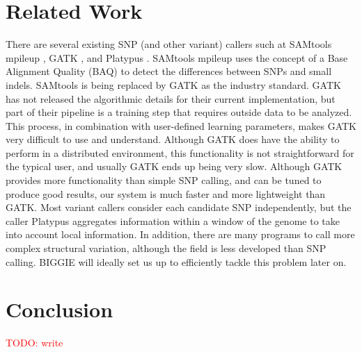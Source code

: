 \documentclass[12pt]{article}
\newcommand\TODO[1]{\textcolor{red}{TODO: #1}}
\begin{document}
\section{Related Work}
\vspace{-8pt}
There are several existing SNP (and other variant) callers such at SAMtools
mpileup \cite{samtools}, GATK \cite{gatk}, and Platypus \cite{platypus}. SAMtools mpileup uses the concept of a Base Alignment Quality (BAQ) to detect the differences between SNPs and small indels.
SAMtools is being replaced by GATK as the industry standard.  GATK has not released the algorithmic details for their current implementation, but part of their pipeline is a training step that requires outside data to be analyzed.  This process, in combination with user-defined learning parameters, makes GATK very difficult to use and understand. Although
GATK does have the ability to perform in a distributed environment, this
functionality is not straightforward for the typical user, and usually GATK
ends up being very slow.  Although GATK provides more functionality than simple
SNP calling, and can be tuned to produce good results, our system is much faster and more
lightweight than GATK.
Most variant callers consider each candidate SNP independently, but the caller
Platypus aggregates information within a window of the genome to take into
account local information. In addition, there are many programs to call more
complex structural variation, although the field is less developed than SNP
calling.  BIGGIE will ideally set us up to efficiently tackle this
problem later on.

\section{Conclusion}

\TODO{write}

\onecolumn
\end{document}
